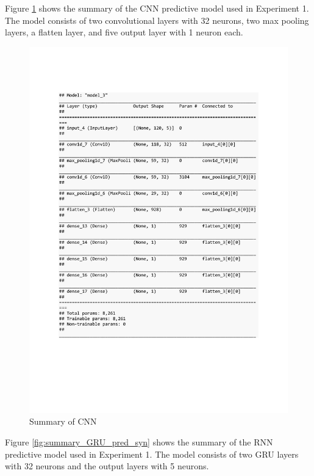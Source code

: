 Figure \ref{fig:summary_CNN_pred_syn} shows the summary of the CNN predictive model used in Experiment 1. The model consists of two convolutional layers with 32 neurons, two max pooling layers, a flatten layer, and five output layer with 1 neuron each. 
\begin{figure}[h]
	\centering
	\includegraphics[scale=0.5]{Figures/summary_CNN_pred_syn}
	\decoRule
	\caption[Experiment 1: Summary of CNN for unsupervised learning]{Summary of CNN \parencite{own}}
	\label{fig:summary_CNN_pred_syn}
\end{figure}
\clearpage
Figure \ref{fig:summary_GRU_pred_syn} shows the summary of the RNN predictive model used in Experiment 1. The model consists of two GRU layers with 32 neurons and the output layers with 5 neurons.  
